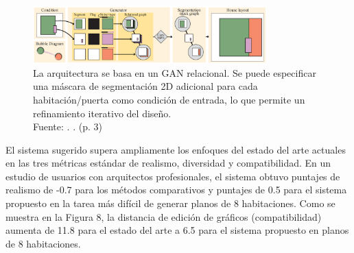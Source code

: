 \begin{figure}[!ht]
	\begin{center}
		\includegraphics[width=0.8\textwidth]{2/figures/nauata2021.png}
		\caption[La arquitectura se basa en un GAN relacional. Se puede especificar una máscara de segmentación 2D adicional para cada habitación/puerta como condición de entrada, lo que permite un refinamiento iterativo del diseño.]{La arquitectura se basa en un GAN relacional. Se puede especificar una máscara de segmentación 2D adicional para cada habitación/puerta como condición de entrada, lo que permite un refinamiento iterativo del diseño.\\
		Fuente: \cite{pr_nauata2021housegan}. . (p. 3)}
		\label{2:fig115}
	\end{center}
\end{figure}

El sistema sugerido supera ampliamente los enfoques del estado del arte actuales en las tres métricas estándar de realismo, diversidad y compatibilidad. En un estudio de usuarios con arquitectos profesionales, el sistema obtuvo puntajes de realismo de -0.7 para los métodos comparativos y puntajes de 0.5 para el sistema propuesto en la tarea más difícil de generar planos de 8 habitaciones. Como se muestra en la Figura 8, la distancia de edición de gráficos (compatibilidad) aumenta de 11.8 para el estado del arte a 6.5 para el sistema propuesto en planos de 8 habitaciones.

